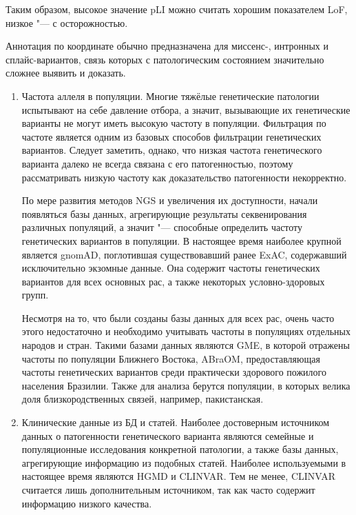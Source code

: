 \documentclass[a4paper,12pt]{article}
\begin{document}
\begin{enumerate}
Таким образом, высокое значение pLI можно считать хорошим показателем LoF, низкое "--- с осторожностью.                                                                                                       \end{enumerate}

Аннотация по координате обычно предназначена для миссенс-, интронных и сплайс-вариантов, связь которых с патологическим состоянием значительно сложнее выявить и доказать.

\begin{enumerate}
\item Частота аллеля в популяции.
Многие тяжёлые генетические патологии испытывают на себе давление отбора, а значит, вызывающие их генетические варианты не могут иметь высокую частоту в популяции.
Фильтрация по частоте является одним из базовых способов фильтрации генетических вариантов.
Следует заметить, однако, что низкая частота генетического варианта далеко не всегда связана с его патогенностью, поэтому рассматривать низкую частоту как доказательство патогенности некорректно.

По мере развития методов NGS и увеличения их доступности, начали появляться базы данных, агрегирующие результаты секвенирования различных популяций, а значит "--- способные определить частоту генетических вариантов в популяции.
В настоящее время наиболее крупной является gnomAD\cite{gnomad}, поглотившая существовавший ранее ExAC, содержавший исключительно экзомные данные.
Она содержит частоты генетических вариантов для всех основных рас, а также некоторых условно-здоровых групп.

Несмотря на то, что были созданы базы данных для всех рас, очень часто этого недостаточно и необходимо учитывать частоты в популяциях отдельных народов и стран.
Такими базами данных являются GME\cite{gme}, в которой отражены частоты по популяции Ближнего Востока, ABraOM\cite{abraom}, предоставляющая частоты генетических вариантов среди практически здорового пожилого населения Бразилии.
Также для анализа берутся популяции, в которых велика доля близкородственных связей, например, пакистанская\cite{saleheen}.

\item Клинические данные из БД и статей.
Наиболее достоверным источником данных о патогенности генетического варианта являются семейные и популяционные исследования конкретной патологии, а также базы данных, агрегирующие информацию из подобных статей.
Наиболее используемыми в настоящее время являются HGMD\cite{hgmd} и CLINVAR.
Тем не менее, CLINVAR считается лишь дополнительным источником, так как часто содержит информацию низкого качества\cite{ryzhkova}.


\end{enumerate}
\end{document}
